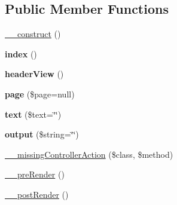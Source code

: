 \subsection*{Public Member Functions}
\begin{DoxyCompactItemize}
\item 
\hyperlink{class_page_not_found_controller_a095c5d389db211932136b53f25f39685}{\_\-\_\-construct} ()
\item 
\hypertarget{class_page_not_found_controller_a149eb92716c1084a935e04a8d95f7347}{
{\bfseries index} ()}
\label{class_page_not_found_controller_a149eb92716c1084a935e04a8d95f7347}

\item 
\hypertarget{class_generic_page_controller_ac6d592a47df3f54da5bd899ff3ada3e9}{
{\bfseries headerView} ()}
\label{class_generic_page_controller_ac6d592a47df3f54da5bd899ff3ada3e9}

\item 
\hypertarget{class_generic_page_controller_a164fce86afb5b2dfb3e62efc0461fd89}{
{\bfseries page} (\$page=null)}
\label{class_generic_page_controller_a164fce86afb5b2dfb3e62efc0461fd89}

\item 
\hypertarget{class_generic_page_controller_a14c153b70c64ec401186d28e6f4770bc}{
{\bfseries text} (\$text=\char`\"{}\char`\"{})}
\label{class_generic_page_controller_a14c153b70c64ec401186d28e6f4770bc}

\item 
\hypertarget{class_generic_page_controller_a14d87d76017cfc33727fbab85204f5a1}{
{\bfseries output} (\$string=\char`\"{}\char`\"{})}
\label{class_generic_page_controller_a14d87d76017cfc33727fbab85204f5a1}

\item 
\hyperlink{class_controller_a728c573e418d1f979340a4669524cacd}{\_\-\_\-missingControllerAction} (\$class, \$method)
\item 
\hyperlink{class_controller_ad86994d2463ea27cab892176e6509bdb}{\_\-\_\-preRender} ()
\item 
\hyperlink{class_controller_adc3c9cc4788f7ba7d1368fdc43568b1d}{\_\-\_\-postRender} ()
\end{DoxyCompactItemize}
